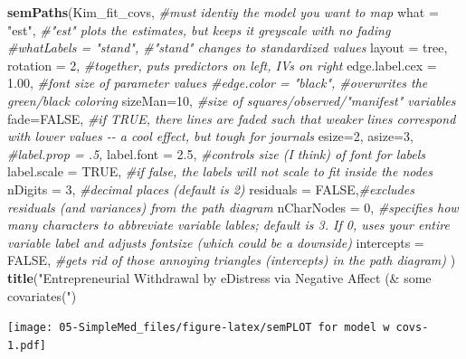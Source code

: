 \documentclass[
  11pt,
]{book}
\newenvironment{Shaded}{\begin{snugshade}}{\end{snugshade}}
\newcommand{\AttributeTok}[1]{\textcolor[rgb]{0.27,0.27,0.27}{#1}}
\newcommand{\CommentTok}[1]{\textcolor[rgb]{0.37,0.37,0.37}{\textit{#1}}}
\newcommand{\ConstantTok}[1]{\textcolor[rgb]{0.37,0.37,0.37}{#1}}
\newcommand{\DecValTok}[1]{\textcolor[rgb]{0.06,0.06,0.06}{#1}}
\newcommand{\FloatTok}[1]{\textcolor[rgb]{0.06,0.06,0.06}{#1}}
\newcommand{\FunctionTok}[1]{\textcolor[rgb]{0.27,0.27,0.27}{\textbf{#1}}}
\newcommand{\NormalTok}[1]{#1}
\newcommand{\StringTok}[1]{\textcolor[rgb]{0.5,0.5,0.5}{#1}}
\begin{document}
\begin{Shaded}
\begin{Highlighting}[]
\FunctionTok{semPaths}\NormalTok{(Kim\_fit\_covs, }\CommentTok{\#must identiy the model you want to map}
         \AttributeTok{what =} \StringTok{"est"}\NormalTok{, }\CommentTok{\#"est" plots the estimates, but keeps it greyscale with no fading}
         \CommentTok{\#whatLabels = "stand", \#"stand" changes to standardized values}
         \AttributeTok{layout =} \StringTok{\textquotesingle{}tree\textquotesingle{}}\NormalTok{, }\AttributeTok{rotation =} \DecValTok{2}\NormalTok{, }\CommentTok{\#together, puts predictors on left, IVs on right }
         \AttributeTok{edge.label.cex =} \FloatTok{1.00}\NormalTok{, }\CommentTok{\#font size of parameter values}
         \CommentTok{\#edge.color = "black", \#overwrites the green/black coloring}
         \AttributeTok{sizeMan=}\DecValTok{10}\NormalTok{, }\CommentTok{\#size of squares/observed/"manifest" variables}
         \AttributeTok{fade=}\ConstantTok{FALSE}\NormalTok{, }\CommentTok{\#if TRUE, there lines are faded such that weaker lines correspond with lower values {-}{-} a cool effect, but tough for journals}
         \AttributeTok{esize=}\DecValTok{2}\NormalTok{, }
         \AttributeTok{asize=}\DecValTok{3}\NormalTok{,}
         \CommentTok{\#label.prop = .5,}
         \AttributeTok{label.font =} \FloatTok{2.5}\NormalTok{, }\CommentTok{\#controls size (I think) of font for labels}
         \AttributeTok{label.scale =} \ConstantTok{TRUE}\NormalTok{, }\CommentTok{\#if false, the labels will not scale to fit inside the nodes}
         \AttributeTok{nDigits =} \DecValTok{3}\NormalTok{, }\CommentTok{\#decimal places (default is 2)}
         \AttributeTok{residuals =} \ConstantTok{FALSE}\NormalTok{,}\CommentTok{\#excludes residuals (and variances) from the path diagram}
         \AttributeTok{nCharNodes =} \DecValTok{0}\NormalTok{, }\CommentTok{\#specifies how many characters to abbreviate variable lables; default is 3.  If 0, uses your entire variable label and adjusts fontsize (which could be a downside)}
         \AttributeTok{intercepts =} \ConstantTok{FALSE}\NormalTok{, }\CommentTok{\#gets rid of those annoying triangles (intercepts) in the path diagram)}
\NormalTok{)}
\FunctionTok{title}\NormalTok{(}\StringTok{"Entrepreneurial Withdrawal by eDistress via Negative Affect (\& some covariates("}\NormalTok{)}
\end{Highlighting}
\end{Shaded}

\texttt{[image: 05-SimpleMed\_files/figure-latex/semPLOT for model w covs-1.pdf]}
\end{document}
